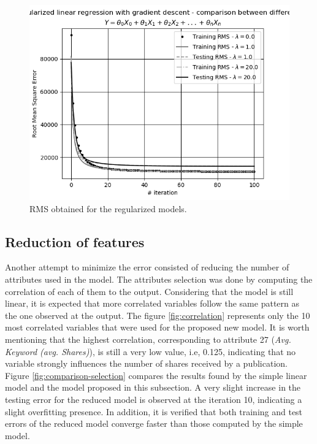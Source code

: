 \documentclass[10pt,twocolumn,letterpaper]{article}
\begin{document}
\begin{figure}
    \centering
    \includegraphics[width=0.9\columnwidth]{img/lr-comparation.png}
    \caption{RMS obtained for the regularized models.}
    \label{fig:reg-comparison}
\end{figure}

\subsection{Reduction of features}

Another attempt to minimize the error consisted of reducing the number of attributes used in the model. The attributes selection was done by computing the correlation of each of them to the output. Considering that the model is still linear, it is expected that more correlated variables follow the same pattern as the one observed at the output. The figure \ref{fig:correlation} represents only the 10 most correlated variables that were used for the proposed new model. It is worth mentioning that the highest correlation, corresponding to attribute 27 (\textit{Avg. Keyword (avg. Shares)}), is still a very low value, i.e, 0.125, indicating that no variable strongly influences the number of shares received by a publication. Figure \ref {fig:comparison-selection} compares the results found by the simple linear model and the model proposed in this subsection. A very slight increase in the testing error for the reduced model is observed at the iteration 10, indicating a slight overfitting presence. In addition, it is verified that both training and test errors of the reduced model converge faster than those computed by the simple model.
\end{document}
